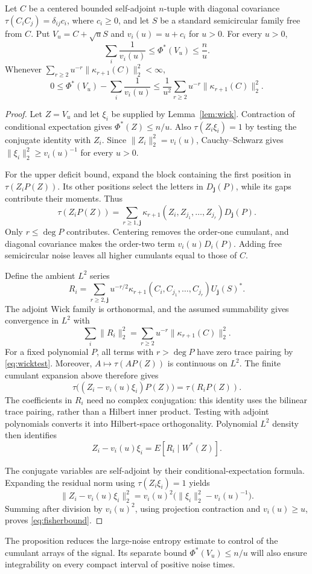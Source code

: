 \begin{proposition}\label{prop:fisher}
Let $C$ be a centered bounded self-adjoint $n$-tuple with diagonal
covariance $\tau(C_iC_j)=\delta_{ij}c_i$, where $c_i\geq0$, and let $S$ be a standard
semicircular family free from $C$. Put $V_u=C+\sqrt u S$ and
$v_i(u)=u+c_i$ for $u>0$. For every $u>0$,
\[
 \sum_i\frac1{v_i(u)}\leq\Phi^*(V_u)\leq\frac n u.
\]
Whenever
$\sum_{r\geq2}u^{-r}\|\kappa_{r+1}(C)\|_2^2<\infty$,
\begin{equation}\label{eq:fisherbound}
 0\leq\Phi^*(V_u)-\sum_i\frac1{v_i(u)}
 \leq\frac1{u^2}\sum_{r\geq2}u^{-r}\|\kappa_{r+1}(C)\|_2^2.
\end{equation}
\end{proposition}

\begin{proof}
Let $Z=V_u$ and let $\xi_i$ be supplied by Lemma~\ref{lem:wick}.
Contraction of conditional expectation gives $\Phi^*(Z)\leq n/u$.
Also $\tau(Z_i\xi_i)=1$ by testing the conjugate identity with $Z_i$.
Since $\|Z_i\|_2^2=v_i(u)$, Cauchy--Schwarz gives
$\|\xi_i\|_2^2\geq v_i(u)^{-1}$ for every $u>0$.

For the upper deficit bound, expand the block containing the first
position in $\tau(Z_iP(Z))$. Its other positions select the letters
in $D_{\mathbf j}(P)$, while its gaps contribute their moments. Thus
\[
 \tau(Z_iP(Z))=\sum_{r\geq1,\mathbf j}
 \kappa_{r+1}(Z_i,Z_{j_1},\ldots,Z_{j_r})D_{\mathbf j}(P).
\]
Only $r\leq\deg P$ contributes. Centering removes the order-one
cumulant, and diagonal covariance makes the order-two term
$v_i(u)D_i(P)$. Adding free semicircular noise leaves all higher
cumulants equal to those of $C$.

Define the ambient $L^2$ series
\[
 R_i=\sum_{r\geq2,\mathbf j}u^{-r/2}
 \kappa_{r+1}(C_i,C_{j_1},\ldots,C_{j_r})U_{\mathbf j}(S)^*.
\]
The adjoint Wick family is orthonormal, and the assumed summability
gives convergence in $L^2$ with
\[
 \sum_i\|R_i\|_2^2=\sum_{r\geq2}u^{-r}\|\kappa_{r+1}(C)\|_2^2.
\]
For a fixed polynomial $P$, all terms with $r>\deg P$ have zero trace
pairing by \eqref{eq:wicktest}. Moreover, $A\mapsto\tau(AP(Z))$ is
continuous on $L^2$. The finite cumulant expansion above therefore gives
\[
 \tau\big((Z_i-v_i(u)\xi_i)P(Z)\big)=\tau(R_iP(Z)).
\]
The coefficients in $R_i$ need no complex conjugation: this identity
uses the bilinear trace pairing, rather than a Hilbert inner product.
Testing with adjoint polynomials converts it into Hilbert-space
orthogonality. Polynomial $L^2$ density then identifies
\[
 Z_i-v_i(u)\xi_i=E[R_i\mid W^*(Z)].
\]

The conjugate variables are self-adjoint by their conditional-expectation
formula. Expanding the residual norm using $\tau(Z_i\xi_i)=1$ yields
\[
 \|Z_i-v_i(u)\xi_i\|_2^2
 =v_i(u)^2\big(\|\xi_i\|_2^2-v_i(u)^{-1}\big).
\]
Summing after division by $v_i(u)^2$, using projection contraction and
$v_i(u)\geq u$, proves \eqref{eq:fisherbound}.
\end{proof}

The proposition reduces the large-noise entropy estimate to control of
the cumulant arrays of the signal. Its separate bound $\Phi^*(V_u)\leq n/u$
will also ensure integrability on every compact interval of positive
noise times.

